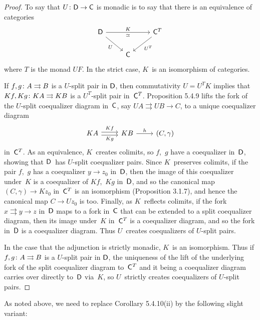\documentclass[../../solutions]{subfiles}
\begin{document}
\begin{proof}[Proof]
  To say that ${U}\colon{{\mathsf{D}}}\to{{\mathsf{C}}}$ is monadic is to say that there is
  an equivalence of categories
  $$
  \begin{tikzcd}
    \sD
    \ar[rr, "K", "\simeq"']
    \ar[dr, "U"']
    && \sC^T
    \ar[dl, "U^T"]
    \\
    & \sC
  \end{tikzcd}
  $$
  where $T$ is the monad $UF$.  In the strict case, $K$~is an
  isomorphism of categories.

  If ${f,g}\colon{A}\rightrightarrows{B}$ is a $U$-split pair in ${\mathsf{D}}$, then
  commutativity $U=U^TK$ implies that ${Kf,Kg}\colon{KA}\rightrightarrows{KB}$ is a
  $U^T$-split pair in~${\mathsf{C}}^T$.  Proposition 5.4.9 lifts the fork of
  the $U$-split coequalizer diagram in~${\mathsf{C}}$, say
  $UA\rightrightarrows UB\to C$, to a unique coequalizer diagram
  $$
  \begin{tikzcd}
    KA
    \ar[r, shift left=0.5ex, "Kf"]
    \ar[r, shift right=0.5ex, "Kg"']
    & KB
    \ar[r, "h"]
    & (C,\gamma)
  \end{tikzcd}
  $$
  in~${\mathsf{C}}^T$.  As an equivalence, $K$~creates colimits, so $f$,~$g$
  have a coequalizer in~${\mathsf{D}}$, showing that ${\mathsf{D}}$~has $U$-split
  coequalizer pairs.  Since $K$~preserves colimits, if the pair
  $f$,~$g$ has a coequalizer $y\to z_0$ in~${\mathsf{D}}$, then the image of
  this coequalizer under~$K$ is a coequalizer of $Kf$,~$Kg$ in~${\mathsf{D}}$,
  and so the canonical map $(C,\gamma)\to Kz_0$ in~${\mathsf{C}}^T$ is an
  isomorphism (Proposition 3.1.7), and hence the canonical map
  $C\to Uz_0$ is too.  Finally, as $K$~reflects colimits, if the fork
  $x \rightrightarrows y\to z$ in~${\mathsf{D}}$ maps to a fork in~${\mathsf{C}}$ that
  can be extended to a split coequalizer diagram, then its image
  under~$K$ in~${\mathsf{C}}^T$ is a coequalizer diagram, and so the fork
  in~${\mathsf{D}}$ is a coequalizer diagram.  Thus $U$~creates coequalizers of
  $U$-split pairs.

  In the case that the adjunction is strictly monadic, $K$~is an
  isomorphism.  Thus if ${f,g}\colon{A}\rightrightarrows{B}$ is a $U$-split pair in
  ${\mathsf{D}}$, the uniqueness of the lift of the underlying fork of the
  split coequalizer diagram to~${\mathsf{C}}^T$ and it being a coequalizer
  diagram carries over directly to~${\mathsf{D}}$ via~$K$, so $U$~strictly
  creates coequalizers of $U$-split pairs.
\end{proof}

As noted above, we need to replace Corollary 5.4.10(ii) by the
following slight variant:
\end{document}

